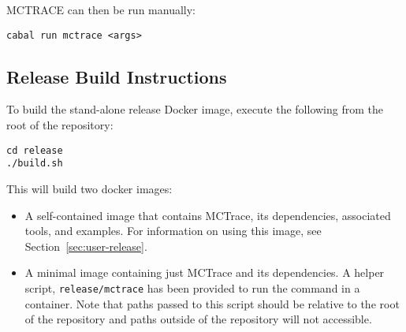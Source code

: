 MCTRACE can then be run manually:

\begin{verbatim}
cabal run mctrace <args>
\end{verbatim}

\subsection{Release Build Instructions}
\label{sec:rele-build-instr}

To build the stand-alone release Docker image, execute the following from the root
of the repository:

\begin{verbatim}
cd release
./build.sh
\end{verbatim}

This will build two docker images: 
\begin{itemize}
\item A self-contained image that contains MCTrace, its dependencies,
  associated tools, and examples. For information on using this image,
  see Section~\ref{sec:user-release}.

\item A minimal image containing just MCTrace and its dependencies. A
  helper script, \texttt{release/mctrace} has been provided to run the
  command in a container. Note that paths passed to this script should
  be relative to the root of the repository and paths outside of the
  repository will not accessible. 
\end{itemize}

